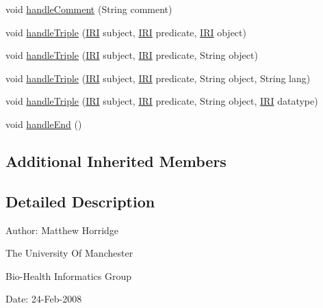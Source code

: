 \begin{DoxyCompactItemize}
\item 
void \hyperlink{classuk_1_1ac_1_1manchester_1_1cs_1_1owl_1_1owlapi_1_1turtle_1_1parser_1_1_o_w_l_r_d_f_consumer_adapter_a76218192c5aa31f70a4bf725e4bdc6c0}{handle\-Comment} (String comment)
\item 
void \hyperlink{classuk_1_1ac_1_1manchester_1_1cs_1_1owl_1_1owlapi_1_1turtle_1_1parser_1_1_o_w_l_r_d_f_consumer_adapter_a6cfefc4cd8bca016c324eb1a96092710}{handle\-Triple} (\hyperlink{classorg_1_1semanticweb_1_1owlapi_1_1model_1_1_i_r_i}{I\-R\-I} subject, \hyperlink{classorg_1_1semanticweb_1_1owlapi_1_1model_1_1_i_r_i}{I\-R\-I} predicate, \hyperlink{classorg_1_1semanticweb_1_1owlapi_1_1model_1_1_i_r_i}{I\-R\-I} object)
\item 
void \hyperlink{classuk_1_1ac_1_1manchester_1_1cs_1_1owl_1_1owlapi_1_1turtle_1_1parser_1_1_o_w_l_r_d_f_consumer_adapter_a379306807f61633c60e0d39c3e7475a8}{handle\-Triple} (\hyperlink{classorg_1_1semanticweb_1_1owlapi_1_1model_1_1_i_r_i}{I\-R\-I} subject, \hyperlink{classorg_1_1semanticweb_1_1owlapi_1_1model_1_1_i_r_i}{I\-R\-I} predicate, String object)
\item 
void \hyperlink{classuk_1_1ac_1_1manchester_1_1cs_1_1owl_1_1owlapi_1_1turtle_1_1parser_1_1_o_w_l_r_d_f_consumer_adapter_a13be6d88e7c55a249b183123d869e614}{handle\-Triple} (\hyperlink{classorg_1_1semanticweb_1_1owlapi_1_1model_1_1_i_r_i}{I\-R\-I} subject, \hyperlink{classorg_1_1semanticweb_1_1owlapi_1_1model_1_1_i_r_i}{I\-R\-I} predicate, String object, String lang)
\item 
void \hyperlink{classuk_1_1ac_1_1manchester_1_1cs_1_1owl_1_1owlapi_1_1turtle_1_1parser_1_1_o_w_l_r_d_f_consumer_adapter_ae03d0374671fbf19e936b57e27883308}{handle\-Triple} (\hyperlink{classorg_1_1semanticweb_1_1owlapi_1_1model_1_1_i_r_i}{I\-R\-I} subject, \hyperlink{classorg_1_1semanticweb_1_1owlapi_1_1model_1_1_i_r_i}{I\-R\-I} predicate, String object, \hyperlink{classorg_1_1semanticweb_1_1owlapi_1_1model_1_1_i_r_i}{I\-R\-I} datatype)
\item 
void \hyperlink{classuk_1_1ac_1_1manchester_1_1cs_1_1owl_1_1owlapi_1_1turtle_1_1parser_1_1_o_w_l_r_d_f_consumer_adapter_af9c8795a5900318d8cf55bcc9e58a576}{handle\-End} ()
\end{DoxyCompactItemize}
\subsection*{Additional Inherited Members}


\subsection{Detailed Description}
Author\-: Matthew Horridge\par
 The University Of Manchester\par
 Bio-\/\-Health Informatics Group\par
 Date\-: 24-\/\-Feb-\/2008\par
\par
 

